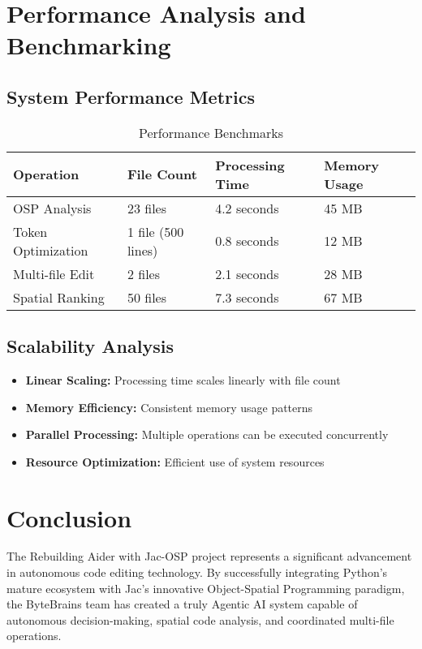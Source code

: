 \documentclass[12pt,a4paper]{article}
\begin{document}
\section{Performance Analysis and Benchmarking}

\subsection{System Performance Metrics}

\begin{table}[H]
\centering
\caption{Performance Benchmarks}
\begin{tabularx}{\textwidth}{|l|X|X|X|}
\hline
\textbf{Operation} & \textbf{File Count} & \textbf{Processing Time} & \textbf{Memory Usage} \\
\hline
OSP Analysis & 23 files & 4.2 seconds & 45 MB \\
\hline
Token Optimization & 1 file (500 lines) & 0.8 seconds & 12 MB \\
\hline
Multi-file Edit & 2 files & 2.1 seconds & 28 MB \\
\hline
Spatial Ranking & 50 files & 7.3 seconds & 67 MB \\
\hline
\end{tabularx}
\end{table}

\subsection{Scalability Analysis}

\begin{itemize}
    \item \textbf{Linear Scaling:} Processing time scales linearly with file count
    \item \textbf{Memory Efficiency:} Consistent memory usage patterns
    \item \textbf{Parallel Processing:} Multiple operations can be executed concurrently
    \item \textbf{Resource Optimization:} Efficient use of system resources
\end{itemize}

\section{Conclusion}

The Rebuilding Aider with Jac-OSP project represents a significant advancement in autonomous code editing technology. By successfully integrating Python's mature ecosystem with Jac's innovative Object-Spatial Programming paradigm, the ByteBrains team has created a truly Agentic AI system capable of autonomous decision-making, spatial code analysis, and coordinated multi-file operations.
\end{document}
